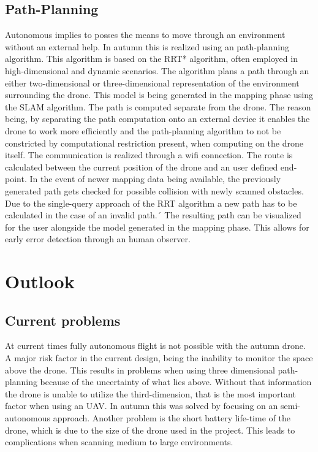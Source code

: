 \subsection{Path-Planning}
Autonomous implies to posses the means to move through an environment without an external help. In autumn this is realized using an path-planning algorithm. This algorithm is based on the RRT* algorithm, often employed in high-dimensional and dynamic scenarios. The algorithm plans a path through an either two-dimensional or three-dimensional representation of the environment surrounding the drone. This model is being generated in the mapping phase using the SLAM algorithm.\newline
The path is computed separate from the drone. The reason being, by separating the path computation onto an external device it enables the drone to work more efficiently and the path-planning algorithm to not be constricted by computational restriction present, when computing on the drone itself. The communication is realized through a wifi connection.\newline
The route is calculated between the current position of the drone and an user defined end-point. In the event of newer mapping data being available, the previously generated path gets checked for possible collision with newly scanned obstacles. Due to the single-query approach of the RRT algorithm a new path has to be calculated in the case of an invalid path.´
The resulting path can be visualized for the user alongside the model generated in the mapping phase. This allows for early error detection through an human observer.

\section{Outlook}

\subsection{Current problems}
At current times fully autonomous flight is not possible with the autumn drone. A major risk factor in the current design, being the inability to monitor the space above the drone.  This results in problems when using three dimensional path-planning because of the uncertainty of what lies above. Without that information the drone is unable to utilize the third-dimension, that is the most important factor when using an UAV. In autumn this was solved by focusing on an semi-autonomous approach.  
Another problem is the short battery life-time of the drone, which is due to the size of the drone used in the project. This leads to complications when scanning medium to large environments.  

